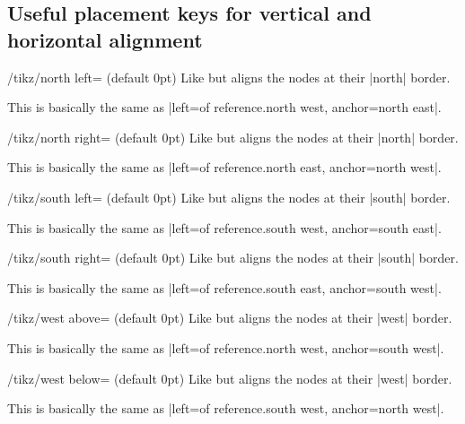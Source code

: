 \subsection{Useful placement keys for vertical and horizontal alignment}
\begin{stylekey}{/tikz/north left= (default 0pt)}
  Like  but aligns the nodes at their |north| border.
  
  This is basically the same as |left=of reference.north west, anchor=north east|.
\begin{codeexample}[preamble=\usetikzlibrary{ext.positioning-plus}]
\end{codeexample}
\end{stylekey}
\begin{stylekey}{/tikz/north right= (default 0pt)}
  Like  but aligns the nodes at their |north| border.
  
  This is basically the same as |left=of reference.north east, anchor=north west|.
\end{stylekey}
\begin{stylekey}{/tikz/south left= (default 0pt)}
  Like  but aligns the nodes at their |south| border.
  
  This is basically the same as |left=of reference.south west, anchor=south east|.
\end{stylekey}
\begin{stylekey}{/tikz/south right= (default 0pt)}
  Like  but aligns the nodes at their |south| border.
  
  This is basically the same as |left=of reference.south east, anchor=south west|.
\end{stylekey}
\begin{stylekey}{/tikz/west above= (default 0pt)}
  Like  but aligns the nodes at their |west| border.
  
  This is basically the same as |left=of reference.north west, anchor=south west|.
\end{stylekey}
\begin{stylekey}{/tikz/west below= (default 0pt)}
  Like  but aligns the nodes at their |west| border.
  
  This is basically the same as |left=of reference.south west, anchor=north west|.
\end{stylekey}
